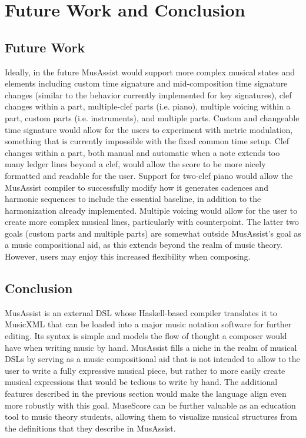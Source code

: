 \documentclass{report}
\begin{document}
\chapter{Future Work and Conclusion}
\section{Future Work}
Ideally, in the future MusAssist would support more complex musical states and elements including custom time signature and mid-composition time signature changes (similar to the behavior currently implemented for key signatures), clef changes within a part, multiple-clef parts (i.e. piano), multiple voicing within a part, custom parts (i.e. instruments), and multiple parts. Custom and changeable time signature would allow for the users to experiment with metric modulation, something that is currently impossible with the fixed common time setup. Clef changes within a part, both manual and automatic when a note extends too many ledger lines beyond a clef, would allow the score to be more nicely formatted and readable for the user. Support for two-clef piano would allow the MusAssist compiler to successfully modify how it generates cadences and harmonic sequences to include the essential baseline, in addition to the harmonization already implemented. Multiple voicing would allow for the user to create more complex musical lines, particularly with counterpoint. The latter two goals (custom parts and multiple parts) are somewhat outside MusAssist's goal as a music compositional aid, as this extends beyond the realm of music theory. However, users may enjoy this increased flexibility when composing.
\section{Conclusion}
MusAssist is an external DSL whose Haskell-based compiler translates it to MusicXML that can be loaded into a major music notation software for further editing. Its syntax is simple and models the flow of thought a composer would have when writing music by hand. MusAssist fills a niche in the realm of musical DSLs by serving as a music compositional aid that is not intended to allow to the user to write a fully expressive musical piece, but rather to more easily create musical expressions that would be tedious to write by hand. The additional features described in the previous section would make the language align even more robustly with this goal. MuseScore can be further valuable as an education tool to music theory students, allowing them to visualize musical structures from the definitions that they describe in MusAssist.
\end{document}
